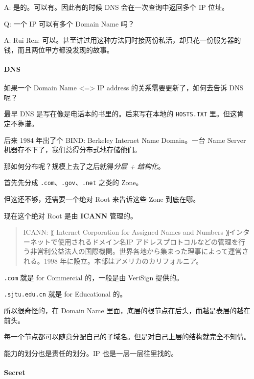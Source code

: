 \documentclass[
]{article}
\begin{document}
A: 是的。可以有。因此有的时候 DNS 会在一次查询中返回多个 IP 位址。

Q: 一个 IP 可以有多个 Domain Name 吗？

A: Rui Ren:
可以。甚至讲过用这种方法同时接两份私活，却只花一份服务器的钱，而且两位甲方都没发现的故事。

\hypertarget{header-n121}{%
\paragraph{DNS}\label{header-n121}}

如果一个 Domain Name \textless=\textgreater{} IP address
的关系需要更新了，如何去告诉 DNS 呢？

最早 DNS 是写在像是电话本的书里的。后来写在本地的 \texttt{HOSTS.TXT}
里。但这肯定不靠谱。

后来 1984 年出了个 BIND: Berkeley Internet Name Domain。一台 Name Server
机器存不下了，我们总得分布式地存储他们。

那如何分布呢？规模上去了之后就得\emph{分层 + 结构化}。

首先先分成 \texttt{.com}、\texttt{.gov}、\texttt{.net} 之类的 Zone。

但这还不够，还需要一个绝对 Root 来告诉这些 Zone 到底在哪。

现在这个绝对 Root 是由 \textbf{ICANN} 管理的。

\begin{quote}
ICANN: 〖 Internet Corporation for Assigned Names and Numbers
〗インターネットで使用されるドメイン名IP
アドレスプロトコルなどの管理を行う非営利公益法人の国際機関。世界各地から集まった理事によって運営される。1998
年に設立。本部はアメリカのカリフォルニア。
\end{quote}

\texttt{.com} 就是 for Commercial 的，一般是由 VeriSign 提供的。

\texttt{.sjtu.edu.cn} 就是 for Educational 的。

所以很奇怪的，在 Domain Name
里面，底层的根节点在后头，而越是表层的越在前头。

每一个节点都可以随意分配自己的子域名。但是对自己上层的结构就完全不知情。

能力的划分也是责任的划分。IP 也是一层一层往里找的。

\hypertarget{header-n136}{%
\paragraph{Secret}\label{header-n136}}
\end{document}
